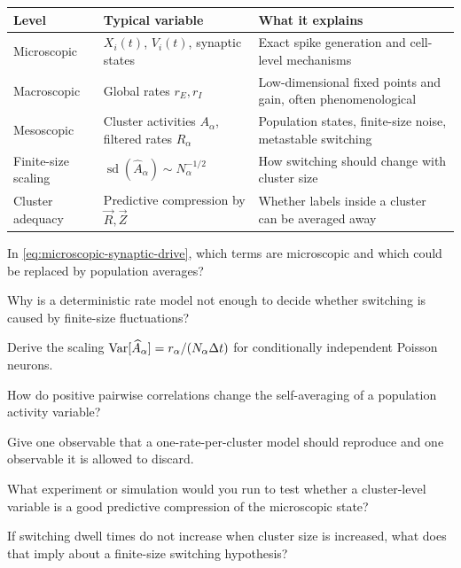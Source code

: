 \begin{chaptersummary}

\begin{center}
\renewcommand{\arraystretch}{1.55}
\begin{tabularx}{\textwidth}{@{}l X X@{}}
  \toprule
  \textbf{Level} & \textbf{Typical variable} & \textbf{What it explains} \\
  \midrule
  Microscopic &
  $X_i(t)$, $V_i(t)$, synaptic states &
  Exact spike generation and cell-level mechanisms \\
  Macroscopic &
  Global rates $r_E,r_I$ &
  Low-dimensional fixed points and gain, often phenomenological \\
  Mesoscopic &
  Cluster activities $A_\alpha$, filtered rates $R_\alpha$ &
  Population states, finite-size noise, metastable switching \\
  Finite-size scaling &
  $\operatorname{sd}(\widehat A_\alpha)\sim N_\alpha^{-1/2}$ &
  How switching should change with cluster size \\
  Cluster adequacy &
  Predictive compression by $\vec R,\vec Z$ &
  Whether labels inside a cluster can be averaged away \\
  \bottomrule
\end{tabularx}
\end{center}

\end{chaptersummary}

\begin{conceptquestions}
  \item In \cref{eq:microscopic-synaptic-drive}, which terms are microscopic and which could be replaced by population averages?
  \item Why is a deterministic rate model not enough to decide whether switching is caused by finite-size fluctuations?
  \item Derive the scaling $\operatorname{Var}[\widehat A_\alpha]=r_\alpha/(N_\alpha\Delta t)$ for conditionally independent Poisson neurons.
  \item How do positive pairwise correlations change the self-averaging of a population activity variable?
  \item Give one observable that a one-rate-per-cluster model should reproduce and one observable it is allowed to discard.
  \item What experiment or simulation would you run to test whether a cluster-level variable is a good predictive compression of the microscopic state?
  \item If switching dwell times do not increase when cluster size is increased, what does that imply about a finite-size switching hypothesis?
\end{conceptquestions}
